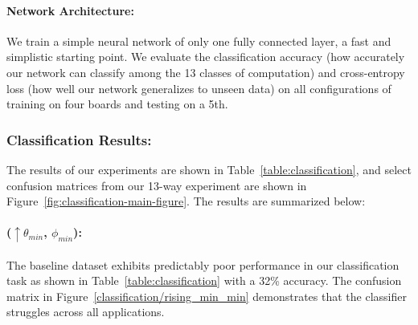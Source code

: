 \paragraph{Network Architecture:}
We train a simple neural network of only one fully connected layer, a fast and simplistic starting point. We evaluate the classification accuracy (how accurately our network can classify among the 13 classes of computation) and cross-entropy loss (how well our network generalizes to unseen data) on all configurations of training on four boards and testing on a 5th. 


\subsubsection*{\textbf{Classification Results:}}
The results of our experiments are shown in Table~\ref{table:classification}, and select confusion matrices from our 13-way experiment are shown in Figure~\ref{fig:classification-main-figure}. The results are summarized below: 



\paragraph{\textbf{($\uparrow\theta_{min}$, $\phi_{min}$)}: }
The baseline dataset exhibits predictably poor performance in our classification task as shown in Table~\ref{table:classification} with a 32\% accuracy. The confusion matrix in Figure~\ref{classification/rising_min_min} demonstrates that the classifier struggles across all applications.
